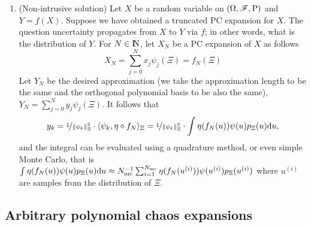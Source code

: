 \documentclass[a4paper,10pt]{scrbook}
\begin{document}
\begin{enumerate}
 \item (Non-intrusive solution) Let \(X\) be a random variable on \((\Omega,\mathscr{F},\mathrm{P})\) and \(Y=f(X)\). Suppose we have obtained a
       truncated PC expansion for \(X\). The question uncertainty propagates from \(X\) to \(Y\)
       via \(f\); in other words, what is the distribution of \(Y\). For \(N\in\N\), let \(X_N\) be 
       a PC expansion of \(X\) as follows
       \[
        X_N = \sum_{j=0}^{N} x_j \psi_j(\Xi) = f_N(\Xi)
       \]
       Let \(Y_N\) be the desired approximation (we take the approximation length to be the same and 
       the orthogonal polynomial basis to be also the same), 
       \(
        Y_N = \sum_{j=0}^{N} y_j \psi_j(\Xi).
       \)
       It follows that 
       \[
        y_k = \nicefrac{1}{\|\psi_k\|^2_\Xi} \cdot \langle\psi_k, \eta\circ f_N\rangle_\Xi =  \nicefrac{1}{\|\psi_k\|^2_\Xi} \cdot \int \eta(f_N(u)) \psi(u) p_\Xi(u) \mathrm{d} u,
       \]
       and the integral can be evaluated using a quadrature method, or even simple Monte Carlo, that is
       \(
       \int \eta(f_N(u)) \psi(u) p_\Xi(u) \mathrm{d} u 
       \approx 
       N_{\mathrm{mc}}^{-1}\sum_{i=1}^{N_{\mathrm{mc}}} \eta(f_N(u^{(i)})) \psi(u^{(i)}) p_\Xi(u^{(i)})
       \)
       where \(u^{(i)}\) are samples from the distribution of \(\Xi\).


\end{enumerate}



\subsection{Arbitrary polynomial chaos expansions}
\end{document}
